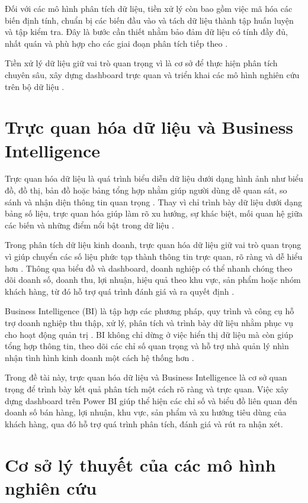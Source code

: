 Đối với các mô hình phân tích dữ liệu, tiền xử lý còn bao gồm việc mã hóa các biến định tính, chuẩn bị các biến đầu vào và tách dữ liệu thành tập huấn luyện và tập kiểm tra. Đây là bước cần thiết nhằm bảo đảm dữ liệu có tính đầy đủ, nhất quán và phù hợp cho các giai đoạn phân tích tiếp theo \cite{geron}.

Tiền xử lý dữ liệu giữ vai trò quan trọng vì là cơ sở để thực hiện phân tích chuyên sâu, xây dựng dashboard trực quan và triển khai các mô hình nghiên cứu trên bộ dữ liệu \cite{islr,geron}.

\section{Trực quan hóa dữ liệu và Business Intelligence}

Trực quan hóa dữ liệu là quá trình biểu diễn dữ liệu dưới dạng hình ảnh như biểu đồ, đồ thị, bản đồ hoặc bảng tổng hợp nhằm giúp người dùng dễ quan sát, so sánh và nhận diện thông tin quan trọng \cite{few}. Thay vì chỉ trình bày dữ liệu dưới dạng bảng số liệu, trực quan hóa giúp làm rõ xu hướng, sự khác biệt, mối quan hệ giữa các biến và những điểm nổi bật trong dữ liệu \cite{few}.

Trong phân tích dữ liệu kinh doanh, trực quan hóa dữ liệu giữ vai trò quan trọng vì giúp chuyển các số liệu phức tạp thành thông tin trực quan, rõ ràng và dễ hiểu hơn \cite{few}. Thông qua biểu đồ và dashboard, doanh nghiệp có thể nhanh chóng theo dõi doanh số, doanh thu, lợi nhuận, hiệu quả theo khu vực, sản phẩm hoặc nhóm khách hàng, từ đó hỗ trợ quá trình đánh giá và ra quyết định \cite{powerbi}.

Business Intelligence (BI) là tập hợp các phương pháp, quy trình và công cụ hỗ trợ doanh nghiệp thu thập, xử lý, phân tích và trình bày dữ liệu nhằm phục vụ cho hoạt động quản trị \cite{powerbi}. BI không chỉ dừng ở việc hiển thị dữ liệu mà còn giúp tổng hợp thông tin, theo dõi các chỉ số quan trọng và hỗ trợ nhà quản lý nhìn nhận tình hình kinh doanh một cách hệ thống hơn \cite{powerbi}.

Trong đề tài này, trực quan hóa dữ liệu và Business Intelligence là cơ sở quan trọng để trình bày kết quả phân tích một cách rõ ràng và trực quan. Việc xây dựng dashboard trên Power BI giúp thể hiện các chỉ số và biểu đồ liên quan đến doanh số bán hàng, lợi nhuận, khu vực, sản phẩm và xu hướng tiêu dùng của khách hàng, qua đó hỗ trợ quá trình phân tích, đánh giá và rút ra nhận xét.

\section{Cơ sở lý thuyết của các mô hình nghiên cứu}

